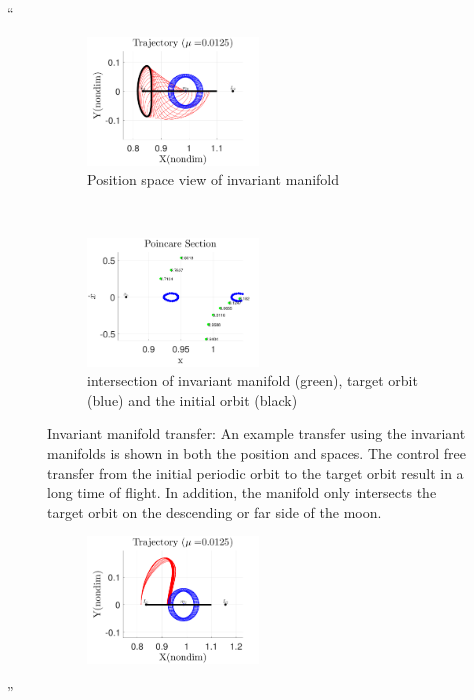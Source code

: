 \documentclass[11pt]{article}
\newenvironment{correction}{\begin{list}{}{\setlength{\leftmargin}{1cm}\setlength{\rightmargin}{1cm}}\vspace{\parsep}\item[]``}{''\end{list}}
\begin{document}
\begin{enumerate}
\begin{correction}
\begin{figure}[H]
        \centering 
        \begin{subfigure}[htbp]{0.5\textwidth} 
                \includegraphics[width=0.5\textwidth]{manifold_trajectory} 
                \caption{Position space view of invariant manifold} \label{fig:manifold_trajectory} 
        \end{subfigure}~ %
        \begin{subfigure}[htbp]{0.5\textwidth} 
                \includegraphics[width=0.5\textwidth]{manifold_poincare} 
                \caption{\Poincare intersection of invariant manifold (green), target orbit (blue) and the initial orbit (black)} \label{fig:manifold_poincare} 
        \end{subfigure} 
        \caption{Invariant manifold transfer: An example transfer using the invariant manifolds is shown in both the position and \Poincare spaces.
        The control free transfer from the initial periodic orbit to the target orbit result in a long time of flight. 
    In addition, the manifold only intersects the target orbit on the descending or far side of the moon.}
\end{figure}
\begin{figure}[H]
        \centering 
        \begin{subfigure}[htbp]{0.5\textwidth} 
                \includegraphics[width=0.5\textwidth]{reach_trajectory} 

\end{subfigure}
\end{figure}
\end{correction}
\end{enumerate}
\end{document}
